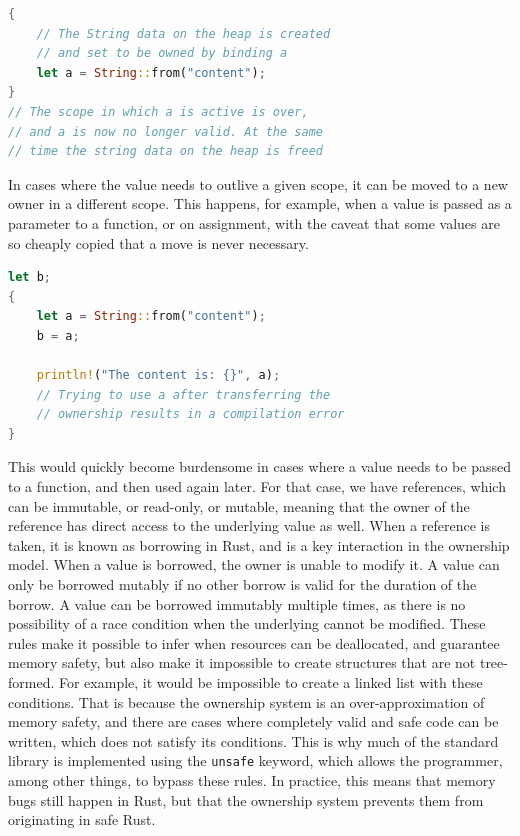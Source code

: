 \documentclass{article}
\begin{document}
\begin{lstlisting}[language=Rust, style=boxed, caption=Heap data owned by binding, label=lst:example-ownership]
{
    // The String data on the heap is created
    // and set to be owned by binding a
    let a = String::from("content");
}
// The scope in which a is active is over,
// and a is now no longer valid. At the same
// time the string data on the heap is freed
\end{lstlisting}

In cases where the value needs to outlive a given scope, it can be moved to a new owner in a different scope. This happens, for example, when a value is passed as a parameter to a function, or on assignment, with the caveat that some values are so cheaply copied that a move is never necessary.

\begin{lstlisting}[language=Rust, style=boxed, caption=Transferring Ownership, label=lst:transfer-ownership]
let b;
{
    let a = String::from("content");
    b = a;

    println!("The content is: {}", a);
    // Trying to use a after transferring the
    // ownership results in a compilation error
}
\end{lstlisting}

This would quickly become burdensome in cases where a value needs to be passed to a function, and then used again later. For that case, we have references, which can be immutable, or read-only, or mutable, meaning that the owner of the reference has direct access to the underlying value as well. When a reference is taken, it is known as borrowing in Rust, and is a key interaction in the ownership model. When a value is borrowed, the owner is unable to modify it. A value can only be borrowed mutably if no other borrow is valid for the duration of the borrow. A value can be borrowed immutably multiple times, as there is no possibility of a race condition when the underlying cannot be modified. These rules make it possible to infer when resources can be deallocated, and guarantee memory safety, but also make it impossible to create structures that are not tree-formed. For example, it would be impossible to create a linked list with these conditions. That is because the ownership system is an over-approximation of memory safety, and there are cases where completely valid and safe code can be written, which does not satisfy its conditions. This is why much of the standard library is implemented using the \lstinline{unsafe} keyword, which allows the programmer, among other things, to bypass these rules. In practice, this means that memory bugs still happen in Rust, but that the ownership system prevents them from originating in safe Rust.
\end{document}

